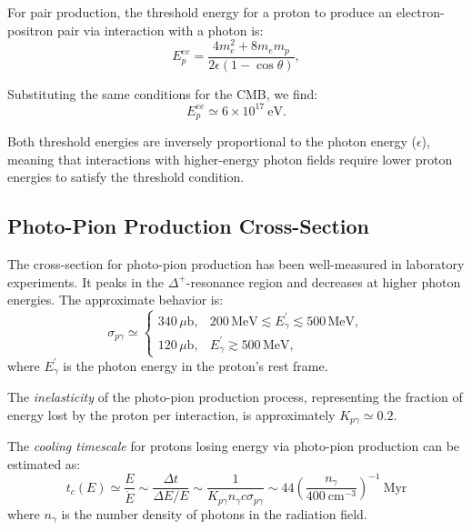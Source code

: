 For pair production, the threshold energy for a proton to produce an electron-positron pair via interaction with a photon is:  
\begin{equation}
E_p^{ee} = \frac{4 m_e^2 + 8 m_e m_p}{2 \epsilon (1 - \cos \theta)},
\end{equation}

Substituting the same conditions for the CMB, we find:
\begin{equation}
E_p^{ee} \simeq 6 \times 10^{17}~\text{eV}.
\end{equation}

Both threshold energies are inversely proportional to the photon energy (\(\epsilon\)), meaning that interactions with higher-energy photon fields  require lower proton energies to satisfy the threshold condition. 

\subsection{Photo-Pion Production Cross-Section}

The cross-section for photo-pion production has been well-measured in laboratory experiments. It peaks in the \(\Delta^+\)-resonance region and decreases at higher photon energies. The approximate behavior is:  
%
\begin{equation}
\sigma_{p\gamma} \simeq 
\begin{cases}
340 \, \mu\text{b}, & 200 \, \text{MeV} \lesssim E_\gamma^\prime \lesssim 500 \, \text{MeV}, \\
120 \, \mu\text{b}, & E_\gamma^\prime \gtrsim 500 \, \text{MeV},
\end{cases}
\end{equation}
%
where \(E_\gamma^\prime\) is the photon energy in the proton’s rest frame.  

The \emph{inelasticity} of the photo-pion production process, representing the fraction of energy lost by the proton per interaction, is approximately \(K_{p\gamma} \simeq 0.2\).  

The \emph{cooling timescale} for protons losing energy via photo-pion production can be estimated as:  
%
\begin{equation}
t_c(E) \simeq \frac{E}{\dot{E}} \sim \frac{\Delta t}{\Delta E / E} \sim \frac{1}{K_{p\gamma} n_\gamma c \sigma_{p\gamma}} \sim 44 \left( \frac{n_\gamma}{400~\text{cm}^{-3}} \right)^{-1}~\text{Myr}
\end{equation}
%
where \(n_\gamma\) is the number density of photons in the radiation field.


